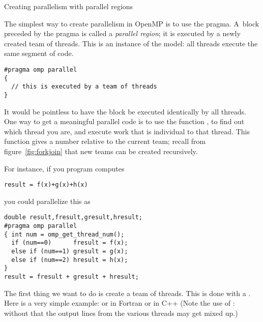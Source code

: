 

 {Creating parallelism with parallel regions}

The simplest way to create parallelism in OpenMP is to use
the  pragma. A~block preceded by the  pragma
is called a \emph{parallel region}; it
is executed by a newly created team of threads. 
This is an instance of the  model: all threads execute the same
segment of code.
\begin{lstlisting}
#pragma omp parallel
{
  // this is executed by a team of threads
}
\end{lstlisting}
It would be pointless to have the block be executed identically by
all threads. One way to get a meaningful parallel code is to use the function
, to find out which thread you are,
and execute work that is individual to that thread.
This function gives a number relative to the current team;
recall from figure~\ref{fig:forkjoin} that new teams can be created recursively.

For instance, if you program computes
\begin{lstlisting}
result = f(x)+g(x)+h(x)
\end{lstlisting}
you could parallelize this as
\begin{lstlisting}
double result,fresult,gresult,hresult;
#pragma omp parallel
{ int num = omp_get_thread_num();
  if (num==0)      fresult = f(x);
  else if (num==1) gresult = g(x);
  else if (num==2) hresult = h(x);
}
result = fresult + gresult + hresult;
\end{lstlisting}

The first thing we want to do is create a team of threads. This
is done with a .
Here is a very simple example:
or in Fortran
or in C++
(Note the use of : without that
the output lines from the various threads may get mixed up.)

